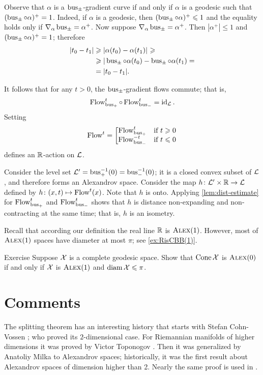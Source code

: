 Observe that $\alpha$ is a $\operatorname{\rm bus}\nolimits_\pm$-gradient curve
if and only if $\alpha$ is a geodesic such that $(\operatorname{\rm bus}\nolimits_\pm\circ\alpha)^+=1$.
Indeed, if $\alpha$ is a geodesic, then $(\operatorname{\rm bus}\nolimits_\pm\circ\alpha)^+\leqslant 1$ and the equality holds only if $\nabla_\alpha\operatorname{\rm bus}\nolimits_\pm=\alpha^+$.
Now suppose $\nabla_\alpha\operatorname{\rm bus}\nolimits_\pm=\alpha^+$.
Then $|\alpha^+|\le 1$ and $(\operatorname{\rm bus}\nolimits_\pm\circ\alpha)^+=1$; therefore 
\begin{align*}
|t_0-t_1|&\ge \dist{\alpha(t_0)}{\alpha(t_1)}{}\ge
\\
&\ge|\bus_\pm\circ\alpha(t_0)-\bus_\pm\circ\alpha(t_1)=
\\
&=|t_0-t_1|.
\end{align*}

It follows that for any $t>0$, the $\operatorname{\rm bus}\nolimits_\pm$-gradient flows commute;
that is, 
\[\mathop{\rm Flow}\nolimits_{\operatorname{\rm bus}\nolimits_+}^t\circ\mathop{\rm Flow}\nolimits_{\operatorname{\rm bus}\nolimits_-}^t=\operatorname{\rm id}\nolimits_{\mathcal{L}}.\]
Setting
\[\mathop{\rm Flow}\nolimits^t=\left[\begin{matrix}
\mathop{\rm Flow}\nolimits_{\operatorname{\rm bus}\nolimits_+}^t&\hbox{if}\ t\geqslant0\\
\mathop{\rm Flow}\nolimits_{\operatorname{\rm bus}\nolimits_-}^{-t}&\hbox{if}\ t\leqslant0
               \end{matrix}\right.\]
defines an $\mathbb{R}$-action on $\mathcal{L}$.

Consider the level set $\mathcal{L}'=\operatorname{\rm bus}\nolimits_+^{-1}(0)=\operatorname{\rm bus}\nolimits_-^{-1}(0)$;
it is a closed convex subset of $\mathcal{L}$, and therefore forms an Alexandrov space.
Consider the map $h\colon\mathcal{L}'\times \mathbb{R}\to \mathcal{L}$ defined by $h\colon(x,t)\mapsto \mathop{\rm Flow}\nolimits^t(x)$.
Note that $h$ is onto.
Applying \ref{lem:dist-estimate} for $\mathop{\rm Flow}\nolimits_{\operatorname{\rm bus}\nolimits_+}^t$ and $\mathop{\rm Flow}\nolimits_{\operatorname{\rm bus}\nolimits_-}^t$ shows that $h$ is distance non-expanding and non-contracting at the same time; that is, $h$ is an isometry.
\qeds

Recall that according our definition the real line $\mathbb{R}$ is $\textsc{Alex}(1)$.
However, most of $\textsc{Alex}(1)$ spaces have diameter at most $\pi$;
see \ref{ex:RisCBB(1)}.

\begin{thm}{Exercise}\label{ex:cone-CBB}
Suppose $\mathcal{X}$ is a complete geodesic space.
Show that $\mathop{\rm Cone}\nolimits\mathcal{X}$ is $\textsc{Alex}(0)$ if and only if $\mathcal{X}$ is $\textsc{Alex}(1)$ and $\operatorname{\rm diam}\nolimits\mathcal{X}\leqslant \pi$.
\end{thm}

\section{Comments}

The splitting theorem has an interesting history that starts with Stefan Cohn-Vossen \cite{cohn-vossen_line};
who proved its $2$-dimensional case.
For Riemannian manifolds of higher dimensions 
it was proved by Victor Toponogov \cite{toponogov-globalization+splitting}.
Then it was generalized by Anatoliy Milka \cite{milka-line}
to Alexandrov spaces;
historically, it was the first result about Alexandrov spaces of dimension higher than 2.
Nearly the same proof is used in \cite[1.5]{burago-burago-ivanov}.

